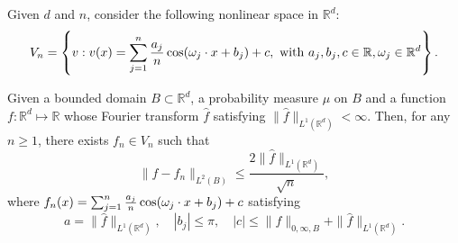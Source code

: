 Given $d$ and $n$, consider the following nonlinear space in $\mathbb
R^d$:
\begin{equation}
	\label{Vn}
	V_n=\left\{v: v(x)=\sum_{j=1}^n{a_j\over n}\cos(\omega_j\cdot x+b_j)+c,
	\mbox{ with }
	a_j, b_j, c\in\mathbb R, \omega_j\in\mathbb R^d
	\right\}.
\end{equation}
\begin{theorem} \label{jones} Given a bounded domain $B\subset\mathbb R^d$, a probability measure $\mu$ on $B$ 
	and a function $f:\mathbb R^d\mapsto\mathbb R$ whose Fourier
	transform $\hat f$ satisfying $\|\hat f\|_{L^1(\mathbb R^d)}<\infty$.
	Then, for any $n\ge 1$,  there exists $f_n\in V_n$  such that
	\begin{equation}
		\|f-f_n\|_{L^2(B)}\le \frac{2\|\hat f\|_{L^1(\mathbb R^d)}}{\sqrt{n}},
	\end{equation}
	where $f_n(x)=\sum_{j=1}^n{a_j\over n}\cos(\omega_j\cdot x+b_j)+c$ satisfying
	\begin{equation}
		\label{abc}
		a=  \|\hat f\|_{L^1(\mathbb R^d)}, \quad |b_j|\le \pi, \quad |c|\le \|f\|_{0,\infty,B}+\|\hat f\|_{L^1(\mathbb R^d)}.
	\end{equation}
\end{theorem}
